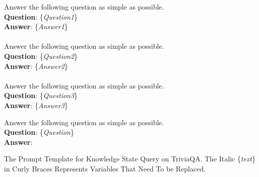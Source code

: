 
\begin{table}[]
    \centering
    
    \begin{tcolorbox}[title={In-Context Examples}, colback=white, coltitle=black, colbacktitle=white!0]
    Answer the following question as simple as possible.\\
    \textbf{Question}: \{\textit{Question1}\}\\
    \textbf{Answer}: \{\textit{Answer1}\}\\
    \\
    Answer the following question as simple as possible.\\
    \textbf{Question}: \{\textit{Question2}\}\\
    \textbf{Answer}: \{\textit{Answer2}\}\\
    \\
    Answer the following question as simple as possible.\\
    \textbf{Question}: \{\textit{Question3}\}\\
    \textbf{Answer}: \{\textit{Answer3}\}\\
    \end{tcolorbox}
    
    \begin{tcolorbox}[title={Instruction}, colback=white, coltitle=black, colbacktitle=white!0]
    Answer the following question as simple as possible.\\
    \textbf{Question}: \{\textit{Question}\}\\
    \textbf{Answer}: 
    \end{tcolorbox}
    
    \caption{The Prompt Template for Knowledge State Query on TriviaQA. The Italic \{\textit{text}\} in Curly Braces Represents Variables That Need To be Replaced.}
    \label{table:prompt_kq_triviaqa}
    
    \end{table}
    